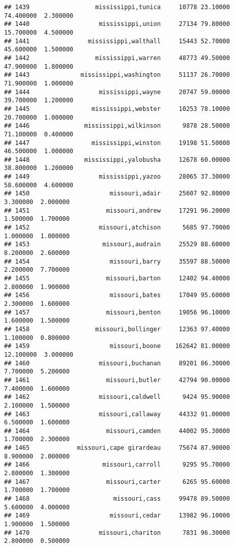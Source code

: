 \documentclass[
]{article}
\begin{document}
\begin{verbatim}
## 1439                  mississippi,tunica     10778 23.10000 74.400000  2.300000
## 1440                   mississippi,union     27134 79.80000 15.700000  4.500000
## 1441                mississippi,walthall     15443 52.70000 45.600000  1.500000
## 1442                  mississippi,warren     48773 49.50000 47.900000  1.800000
## 1443              mississippi,washington     51137 26.70000 71.900000  1.000000
## 1444                   mississippi,wayne     20747 59.00000 39.700000  1.200000
## 1445                 mississippi,webster     10253 78.10000 20.700000  1.000000
## 1446               mississippi,wilkinson      9878 28.50000 71.100000  0.400000
## 1447                 mississippi,winston     19198 51.50000 46.500000  1.000000
## 1448               mississippi,yalobusha     12678 60.00000 38.800000  1.200000
## 1449                   mississippi,yazoo     28065 37.30000 58.600000  4.600000
## 1450                      missouri,adair     25607 92.80000  3.300000  2.000000
## 1451                     missouri,andrew     17291 96.20000  1.500000  1.700000
## 1452                   missouri,atchison      5685 97.70000  1.000000  1.000000
## 1453                    missouri,audrain     25529 88.60000  8.200000  2.600000
## 1454                      missouri,barry     35597 88.50000  2.200000  7.700000
## 1455                     missouri,barton     12402 94.40000  2.800000  1.900000
## 1456                      missouri,bates     17049 95.60000  2.300000  1.600000
## 1457                     missouri,benton     19056 96.10000  1.600000  1.500000
## 1458                  missouri,bollinger     12363 97.40000  1.100000  0.800000
## 1459                      missouri,boone    162642 81.00000 12.100000  3.000000
## 1460                   missouri,buchanan     89201 86.30000  7.700000  5.200000
## 1461                     missouri,butler     42794 90.00000  7.400000  1.600000
## 1462                   missouri,caldwell      9424 95.90000  2.100000  1.500000
## 1463                   missouri,callaway     44332 91.00000  6.500000  1.600000
## 1464                     missouri,camden     44002 95.30000  1.700000  2.300000
## 1465             missouri,cape girardeau     75674 87.90000  8.900000  2.000000
## 1466                    missouri,carroll      9295 95.70000  2.800000  1.300000
## 1467                     missouri,carter      6265 95.60000  1.700000  1.700000
## 1468                       missouri,cass     99478 89.50000  5.600000  4.000000
## 1469                      missouri,cedar     13982 96.10000  1.900000  1.500000
## 1470                   missouri,chariton      7831 96.30000  2.800000  0.500000

\end{verbatim}
\end{document}
